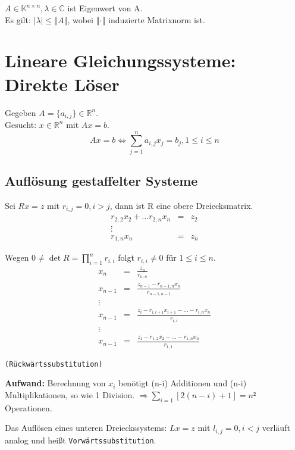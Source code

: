 \documentclass[a4paper,10pt]{article}
\newcommand{\norm}[1]{ \left\Vert #1 \right\Vert }
\newtheorem[L]{satz}{Satz}[section]
\newtheorem[S]{beweis}{Beweis}
\newtheorem[S]{beh}{Behauptung}
\begin{document}
$A \in \mathbb{K}^{n \times n}, \lambda \in \mathbb{C}$ ist Eigenwert von A.\\
Es gilt: $ | \lambda | \leq \norm{A}$, wobei $\norm{\cdot}$ induzierte Matrixnorm ist.
\newpage

\section{Lineare Gleichungssysteme: Direkte Löser}
Gegeben $A = \{a_{i,j}\} \in \mathbb{R}^n$.\\
Gesucht: $x \in \mathbb{R}^n$ mit $Ax = b$.
\begin{equation}
 Ax = b \Leftrightarrow \sum\limits_{j = 1}^n a_{i,j}x_j = b_j, 1 \leq i\leq n 
\end{equation}


\subsection{Auflösung gestaffelter Systeme}
Sei $Rx = z$ mit $r_{i,j} = 0, i > j$, dann ist R eine obere Dreiecksmatrix.\\

\smallskip
 \begin{eqnarray*} %
  r_{2,2}x_2+ \ldots r_{2,n}x_n &=& z_2\\
  \vdots\\
  r_{1,n}x_n &=& z_n
 \end{eqnarray*}

Wegen $0 \neq \det{R} = \prod \limits_{i = 1}^n r_{i,i} $ folgt $ r_{i,i} \neq 0$ für $ 1 \leq i \leq n$.
\begin{eqnarray*}
  x_n &=& \frac{z_n}{r_{n,n}}\\
  x_{n-1} &=& \frac{  z_{n-1} - r_{n-1, n} x_n  }{  r_{n-1,n-1}  }\\
  \vdots\\
  x_{n-1} &=& \frac{z_{i} - r_{i, i+1} x_{i+1} - \ldots - r_{i, n} x_n}{r_{i,i}}\\
  \vdots\\
  x_{n-1} &=& \frac{z_{1} - r_{1, 2} x_{2} - \ldots - r_{1, n} x_n}{r_{1,1}}
\end{eqnarray*}

\texttt{(Rückwärtssubstitution)}\\

\smallskip

\textbf{Aufwand:} Berechnung von $x_i$ benötigt (n-i) Additionen und (n-i) Multiplikationen, so wie 1 Division.
$\Rightarrow \sum\limits_{i=1} {[2(n-i)+1 ]} = n²$ Operationen.\\

\smallskip

Das Auflösen eines unteren Dreieckssystems: $Lx = z$ mit $l_{i,j}= 0  , i< j$
verläuft analog und heißt \texttt{Vorwärtssubstitution}.
\end{document}
